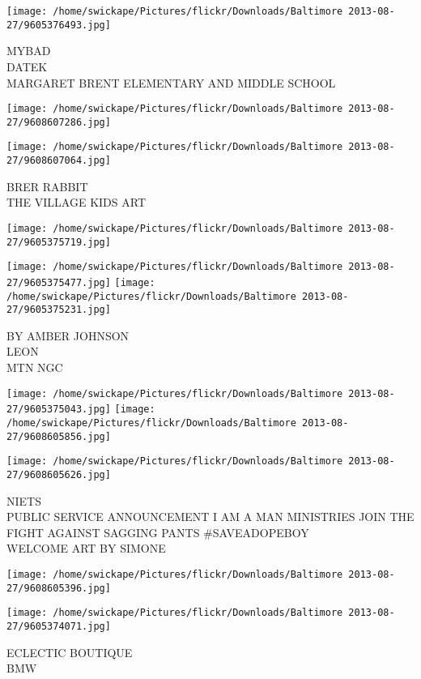 \documentclass[10pt,letterpaper]{article}
\begin{document}
\vspace{0.25in}
\texttt{[image: /home/swickape/Pictures/flickr/Downloads/Baltimore 2013-08-27/9605376493.jpg]}

MYBAD\\
DATEK\\
MARGARET BRENT ELEMENTARY AND MIDDLE SCHOOL
\pagebreak

\texttt{[image: /home/swickape/Pictures/flickr/Downloads/Baltimore 2013-08-27/9608607286.jpg]}

\vspace{0.25in}
\texttt{[image: /home/swickape/Pictures/flickr/Downloads/Baltimore 2013-08-27/9608607064.jpg]}

BRER RABBIT\\
THE VILLAGE KIDS ART
\pagebreak

\texttt{[image: /home/swickape/Pictures/flickr/Downloads/Baltimore 2013-08-27/9605375719.jpg]}

\vspace{0.25in}
\texttt{[image: /home/swickape/Pictures/flickr/Downloads/Baltimore 2013-08-27/9605375477.jpg]}
\texttt{[image: /home/swickape/Pictures/flickr/Downloads/Baltimore 2013-08-27/9605375231.jpg]}

BY AMBER JOHNSON\\
LEON\\
MTN NGC
\pagebreak

\texttt{[image: /home/swickape/Pictures/flickr/Downloads/Baltimore 2013-08-27/9605375043.jpg]}
\texttt{[image: /home/swickape/Pictures/flickr/Downloads/Baltimore 2013-08-27/9608605856.jpg]}

\texttt{[image: /home/swickape/Pictures/flickr/Downloads/Baltimore 2013-08-27/9608605626.jpg]}

NIETS\\
PUBLIC SERVICE ANNOUNCEMENT I AM A MAN MINISTRIES JOIN THE FIGHT AGAINST SAGGING PANTS \#SAVEADOPEBOY\\
WELCOME ART BY SIMONE
\pagebreak

\texttt{[image: /home/swickape/Pictures/flickr/Downloads/Baltimore 2013-08-27/9608605396.jpg]}

\vspace{0.25in}
\texttt{[image: /home/swickape/Pictures/flickr/Downloads/Baltimore 2013-08-27/9605374071.jpg]}

ECLECTIC BOUTIQUE\\
BMW
\pagebreak
\end{document}

